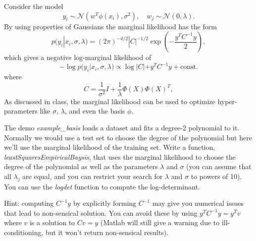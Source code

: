 \documentclass{article}
\begin{document}
 Consider the model
\[
y_i \sim \mathcal{N}(w^T\phi(x_i),\sigma^2), \quad w_j \sim \mathcal{N}(0,\lambda).
\]
By using properties of Gaussians the marginal likelihood has the form
\[
p(y_i|x_i,\sigma,\lambda) = (2\pi)^{-d/2}|C|^{-1/2}\exp\left(-\frac{y^TC^{-1}y}{2}\right),
\]
which gives a negative log-marginal likelihood of
\[
- \log p(y_i|x_i,\sigma,\lambda) \propto \log|C| + y^TC^{-1}y + \text{const.}
\]
where
\[
C = \frac{1}{\sigma^2}I + \frac{1}{\lambda}\Phi(X)\Phi(X)^T,
\]
As discussed in class, the marginal likelihood can be used to optimize hyper-parameters like $\sigma$, $\lambda$, and even the basis $\phi$.

The demo \emph{example\_basis} loads a dataset and fits a degree-2 polynomial to it. Normally we would use a test set to choose the degree of the polynomial but here we'll use the marginal likelihood of the training set. Write a function, \emph{leastSquaresEmpiricalBaysis}, that uses the marginal likelihood to choose the degree of the polynomial as well as the parameters $\lambda$ and $\sigma$ (you can assume that all $\lambda_j$ are equal, and you can restrict your search for $\lambda$ and $\sigma$ to powers of 10).  You can use the \emph{logdet} function to compute the log-determinant.

{Hint: computing $C^{-1}y$ by explicitly forming $C^{-1}$ may give you numerical issues that lead to non-sensical solution. You can avoid these by using $y^TC^{-1}y = y^Tv$ where $v$ is a solution to $Cv = y$ (Matlab will still give a warning due to ill-conditioning, but it won't return non-sensical results).}
\end{document}
